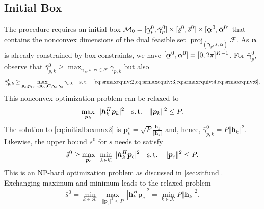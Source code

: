 \documentclass[a4paper,10pt,journal]{IEEEtran}
\DeclareMathOperator\proj{proj}
\newcommand{\st}{\mathrm{s.\,t.}}
\let\vec\bm
\newcommand{\ubar}[1]{\underaccent{\bar}{#1}}
\begin{document}
\subsection{Initial Box} \label{sec:initbox}
The  procedure requires an initial box $\mathcal M_0 = [\ubar{\vec\gamma}_p^0, \bar{\vec\gamma}_p^0] \times [\ubar s^0, \bar s^0] \times [\ubar{\vec\alpha}^0, \bar{\vec\alpha}^0]$ that contains the nonconvex dimensions of the dual feasible set $\proj_{(\vec\gamma_p, s, \vec\alpha)} \mathcal F$. As $\vec\alpha$ is already constrained by box constraints, we have $[\ubar{\vec\alpha}^0, \bar{\vec\alpha}^0] = [0, 2\pi]^{K-1}$. For $\bar{\vec\gamma}_p^0$, observe that $\bar\gamma_{p,k}^0 \ge \max_{\vec\gamma_p, s, \vec\alpha\in\mathcal F} \gamma_{p,k}$ but also
\begin{equation}
	\bar\gamma_{p,k}^0 \ge \max_{\substack{\vec p_c, \vec p_1, \dots, \vec p_K, \vec C, \vec \gamma_c, \vec \gamma_p}} \gamma_{p,k} \quad\st\quad \text{\cref{eq:srmaxequiv:2,eq:srmaxequiv:3,eq:srmaxequiv:4,eq:srmaxequiv:6}}.
	\label{eq:intialboxmax}
\end{equation}
This nonconvex optimization problem can be relaxed to
\begin{equation}
	\max_{\vec p_k}\enskip |{\vec{h}}_{k}^{H}\vec{p}_{k}|^2 \quad\st\quad \Vert \vec p_k \Vert^2 \le P. \label{eq:initialboxmax2}
\end{equation}
The solution to \cref{eq:initialboxmax2} is $\vec p_k^\star = \sqrt{P} \frac{\vec h_k}{\Vert\vec h_k\Vert}$ \cite[\S 5.3.2]{Tse2005} and, hence, $\bar\gamma_{p,k}^0 = P \Vert \vec h_k \Vert^2$.
Likewise, the upper bound $\bar s^0$ for $s$ needs to satisfy
\begin{equation}\label{eq:sitsboxinter}
	\bar s^0 \ge 
	\max_{\vec p_c}\enskip \min_{k\in\mathcal K}\ |{\vec{h}}_{k}^{H}\vec{p}_{c}|^2
\quad\st\quad
\Vert \vec p_c \Vert^2 \le P.
\end{equation}
This is an NP-hard optimization problem as discussed in \cref{sec:sitfund}. Exchanging maximum and minimum leads to the relaxed problem
\begin{equation}
	\bar s^0 = \min_{k\in\mathcal K}\ \max_{\Vert \vec p_c \Vert^2 \le P}\ |{\vec{h}}_{k}^{H}\vec{p}_{c}|^2 = \min_{k\in\mathcal K} P \Vert \vec h_k \Vert^2.
\end{equation}
\end{document}
